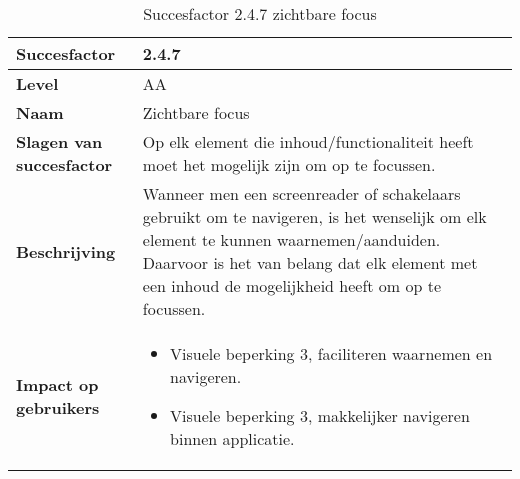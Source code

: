 \begin{table}[H]
    \centering
    \caption{Succesfactor 2.4.7 zichtbare focus}
    
    
    \hspace*{-1cm}\begin{tabular}{|l|p{12cm}|} 
        \hline
        \textbf{Succesfactor}                 & 2.4.7                                                                                                                                                                                                                                                                                                                                                                                                                                                                                                          \\ 
        \hline
        \textbf{Level}                        & AA                                                                                                                                                                                                                                                                                                                                                                                                                                                                                                               \\ 
        \hline
        \textbf{Naam}                         & Zichtbare focus~                                                                                                                                                                                                                                                                                                                                                                                                                                                                                      \\ 
        \hline
        \textbf{Slagen van succesfactor}      & Op elk element die inhoud/functionaliteit heeft moet het mogelijk zijn om op te focussen.                                                                                                                 \\ 
        
        \hline
        \textbf{Beschrijving}                 & Wanneer men een screenreader of schakelaars gebruikt om te navigeren, is het wenselijk om elk element te kunnen waarnemen/aanduiden. Daarvoor is het van belang dat elk element met een inhoud de mogelijkheid heeft om op te focussen.\\ 
        \hline
        \textbf{Impact op gebruikers}         &  
        \begin{itemize}
            \item Visuele beperking 3, faciliteren waarnemen en navigeren.
            \item Visuele beperking 3, makkelijker navigeren binnen applicatie.
            

\end{itemize}
\end{tabular}
\end{table}
